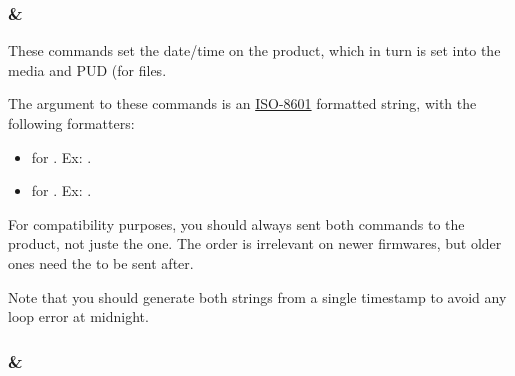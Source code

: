 \begin{table}[h]
\centering
{}
\caption{Final command for each Settings/State request}
\end{table}

\subsubsection{ \&\\}

These commands set the date/time on the product, which in turn is set into the media and PUD (for  files.

The argument to these commands is an \href{https://en.wikipedia.org/wiki/ISO_8601}{ISO-8601} formatted string, with the following formatters:
\begin{itemize}
\item{ for . Ex: .}
\item{ for . Ex: .}
\end{itemize}

For compatibility purposes, you should always sent both commands to the product, not juste the  one. The order is irrelevant on newer firmwares, but older ones need the  to be sent after.

Note that you should generate both strings from a single timestamp to avoid any loop error at midnight.

\subsubsection{ \&\\}


